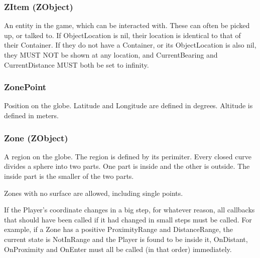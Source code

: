 \documentclass{article}
\begin{document}

\subsubsection{ZItem (ZObject)}
An entity in the game, which can be interacted with. These can often be picked up, or talked to.  If ObjectLocation is nil, their location is identical to that of their Container.  If they do not have a Container, or its ObjectLocation is also nil, they MUST NOT be shown at any location, and CurrentBearing and CurrentDistance MUST both be set to infinity.

\subsubsection{ZonePoint}
Position on the globe.  Latitude and Longitude are defined in degrees.
Altitude is defined in meters.

\subsubsection{Zone (ZObject)}
A region on the globe. The region is defined by its perimiter.  Every closed
curve divides a sphere into two parts. One part is inside and the other is
outside. The inside part is the smaller of the two parts.

Zones with no surface are allowed, including single points.

If the Player's coordinate changes in a big step, for whatever reason, all
callbacks that should have been called if it had changed in small steps must be
called. For example, if a Zone has a positive ProximityRange and DistanceRange,
the current state is NotInRange and the Player is found to be inside it,
OnDistant, OnProximity and OnEnter must all be called (in that order)
immediately.
\end{document}
